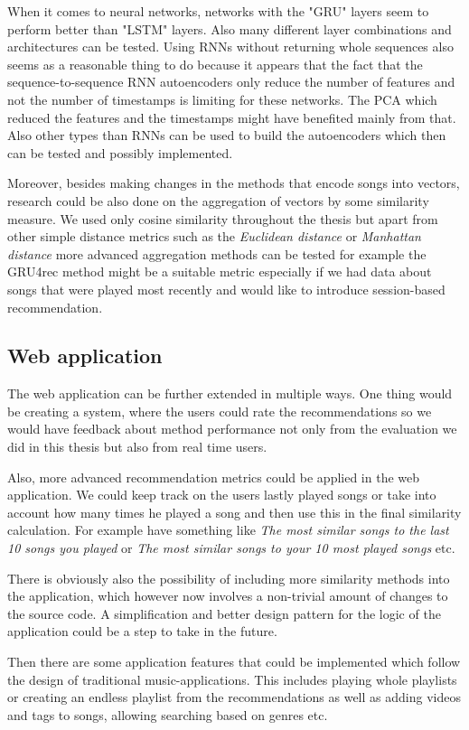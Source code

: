 When it comes to neural networks, networks with the "GRU" layers seem to perform better than "LSTM" layers. Also many different layer combinations and architectures can be tested. Using RNNs without returning whole sequences also seems as a reasonable thing to do because it appears that the fact that the sequence-to-sequence RNN autoencoders only reduce the number of features and not the number of timestamps is limiting for these networks. The PCA which reduced the features and the timestamps might have benefited mainly from that. Also other types than RNNs can be used to build the autoencoders which then can be tested and possibly implemented.

Moreover, besides making changes in the methods that encode songs into vectors, research could be also done on the aggregation of vectors by some similarity measure. We used only cosine similarity throughout the thesis but apart from other simple distance metrics such as the \textit{Euclidean distance} or \textit{Manhattan distance} more advanced aggregation methods can be tested for example the GRU4rec \cite{gru4rec_article} method might be a suitable metric especially if we had data about songs that were played most recently and would like to introduce session-based recommendation.

\subsection*{Web application}
The web application can be further extended in multiple ways. One thing would be creating a system, where the users could rate the recommendations so we would have feedback about method performance not only from the evaluation we did in this thesis but also from real time users. 

Also, more advanced recommendation metrics could be applied in the web application. We could keep track on the users lastly played songs or take into account how many times he played a song and then use this in the final similarity calculation. For example have something like \textit{The most similar songs to the last 10 songs you played} or \textit{The most similar songs to your 10 most played songs} etc. 

There is obviously also the possibility of including more similarity methods into the application, which however now involves a non-trivial amount of changes to the source code. A simplification and better design pattern for the logic of the application could be a step to take in the future. 

Then there are some application features that could be implemented which follow the design of traditional music-applications. This includes playing whole playlists or creating an endless playlist from the recommendations as well as adding videos and tags to songs, allowing searching based on genres etc. 


